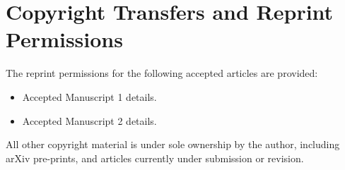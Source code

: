 \chapter{Copyright Transfers and Reprint Permissions}\label{app:copyright}

The reprint permissions for the following accepted articles are provided:
\begin{itemize}
	\item Accepted Manuscript 1 details.
	\item Accepted Manuscript 2 details.
\end{itemize}
All other copyright material is under sole ownership by the author, including arXiv pre-prints, and articles currently under submission or revision.

%
%